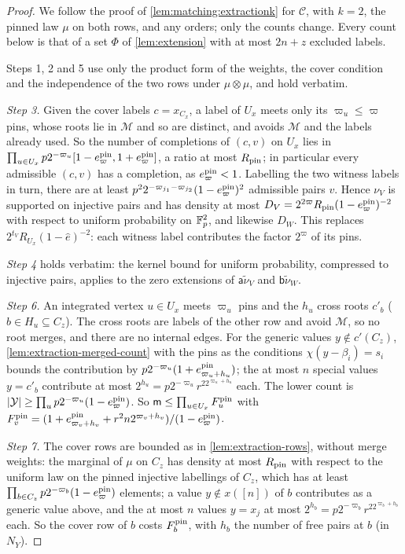 \begin{proof}
We follow the proof of \cref{lem:matching:extractionk} for $\mathcal C$, with
$k=2$, the pinned law $\mu$ on both rows, and any orders; only the counts change.
Every count below is that of a set $\Phi$ of \cref{lem:extension} with at most
$2n+z$ excluded labels.

Steps 1, 2 and 5 use only the product form of the weights, the cover condition
and the independence of the two rows under $\mu\otimes\mu$, and hold verbatim.

\emph{Step 3.} Given the cover labels $c=x_{C_x}$, a label of $U_x$ meets only its
$\varpi_u\le\varpi$ pins, whose roots lie in $\mathcal M$ and so are distinct, and
avoids $\mathcal M$ and the labels already used. So the number of completions of
$(c,v)$ on $U_x$ lies in $\prod_{u\in U_x}p2^{-\varpi_u}[1-e^{\rm pin}_\varpi,
1+e^{\rm pin}_\varpi]$, a ratio at most $R_{\rm pin}$; in particular every admissible
$(c,v)$ has a completion, as $e^{\rm pin}_\varpi<1$. Labelling the two witness
labels in turn, there are at least $p^22^{-\varpi_{j_1}-\varpi_{j_2}}
(1-e^{\rm pin}_\varpi)^2$ admissible pairs $v$. Hence $\nu_V$ is supported on
injective pairs and has density at most $D_V=2^{2\varpi}R_{\rm pin}
(1-e^{\rm pin}_\varpi)^{-2}$ with respect to uniform probability on $\mathbb F_p^2$, and
likewise $D_W$. This replaces $2^{t_V}R_{U_x}(1-\hat e)^{-2}$: each witness label
contributes the factor $2^{\varpi}$ of its pins.

\emph{Step 4} holds verbatim: the kernel bound for uniform probability, compressed to
injective pairs, applies to the zero extensions of $\mathsf a\tilde\nu_V$ and
$\mathsf b\tilde\nu_W$.

\emph{Step 6.} An integrated vertex $u\in U_x$ meets $\varpi_u$ pins and the $h_u$
cross roots $c'_b$ ($b\in H_u\subseteq C_z$). The cross roots are labels of the other
row and avoid $\mathcal M$, so no root merges, and there are no internal edges. For the
generic values $y\notin c'(C_z)$, \cref{lem:extraction-merged-count} with the pins as
the conditions $\chi(y-\beta_i)=s_i$ bounds the contribution by
$p2^{-\varpi_u}(1+e^{\rm pin}_{\varpi_u+h_u})$; the at most $n$ special values
$y=c'_b$ contribute at most $2^{h_u}=p2^{-\varpi_u}r^22^{\varpi_u+h_u}$ each. The lower
count is $|\mathcal Y|\ge\prod_up2^{-\varpi_u}(1-e^{\rm pin}_\varpi)$. So
$\mathsf m\le\prod_{u\in U_x}F^{\rm pin}_u$ with
$F^{\rm pin}_v=(1+e^{\rm pin}_{\varpi_v+h_v}+r^2n2^{\varpi_v+h_v})/(1-e^{\rm pin}_\varpi)$.

\emph{Step 7.} The cover rows are bounded as in \cref{lem:extraction-rows}, without
merge weights: the marginal of $\mu$ on $C_z$ has density at most $R_{\rm pin}$ with
respect to the uniform law on the pinned injective labellings of $C_z$, which has at
least $\prod_{b\in C_z}p2^{-\varpi_b}(1-e^{\rm pin}_\varpi)$ elements; a value
$y\notin x([n])$ of $b$ contributes as a generic value above, and the at most $n$
values $y=x_j$ at most $2^{h_b}=p2^{-\varpi_b}r^22^{\varpi_b+h_b}$ each. So the cover
row of $b$ costs $F^{\rm pin}_b$, with $h_b$ the number of free pairs at $b$ (in $N_Y$).


\end{proof}
